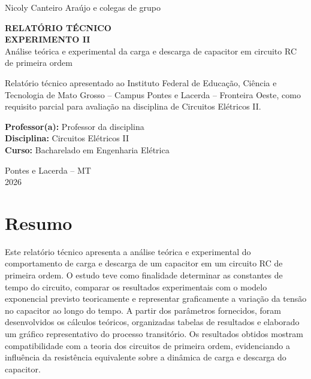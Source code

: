 \documentclass[12pt,a4paper]{article}
\begin{document}
\begin{titlepage}
\thispagestyle{empty}

\begin{center}

\vspace*{2cm}

{\large Nicoly Canteiro Araújo e colegas de grupo}\\


\vspace{4cm}

{\Large \textbf{RELATÓRIO TÉCNICO}}\\[0.4cm]
{\large \textbf{EXPERIMENTO II}}\\[0.8cm]
{\large Análise teórica e experimental da carga e descarga de capacitor em circuito RC de primeira ordem}

\end{center}

\vspace{2.5cm}

\hfill
\begin{minipage}{0.48\textwidth}
\singlespacing
Relatório técnico apresentado ao Instituto Federal de Educação, Ciência e Tecnologia de Mato Grosso -- Campus Pontes e Lacerda -- Fronteira Oeste, como requisito parcial para avaliação na disciplina de Circuitos Elétricos II.

\vspace{0.8cm}

\textbf{Professor(a):} Professor da disciplina\\
\textbf{Disciplina:} Circuitos Elétricos II\\
\textbf{Curso:} Bacharelado em Engenharia Elétrica
\end{minipage}

\vfill

\begin{center}
Pontes e Lacerda -- MT\\
2026
\end{center}

\end{titlepage}
\section*{Resumo}

Este relatório técnico apresenta a análise teórica e experimental do comportamento de carga e descarga de um capacitor em um circuito RC de primeira ordem. O estudo teve como finalidade determinar as constantes de tempo do circuito, comparar os resultados experimentais com o modelo exponencial previsto teoricamente e representar graficamente a variação da tensão no capacitor ao longo do tempo. A partir dos parâmetros fornecidos, foram desenvolvidos os cálculos teóricos, organizadas tabelas de resultados e elaborado um gráfico representativo do processo transitório. Os resultados obtidos mostram compatibilidade com a teoria dos circuitos de primeira ordem, evidenciando a influência da resistência equivalente sobre a dinâmica de carga e descarga do capacitor.
\end{document}
